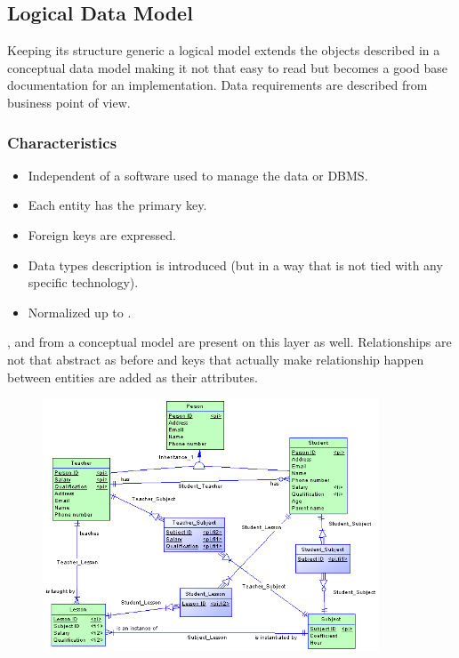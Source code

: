 \subsection{Logical Data Model}

Keeping its structure generic a logical model extends the objects described in a conceptual data model making it not that easy to read but becomes a good base documentation for an implementation. Data requirements are described from business point of view.

\subsubsection{Characteristics}
\begin{itemize}
	\item Independent of a software used to manage the data or DBMS.
	\item Each entity has the primary key.
	\item Foreign keys are expressed.
	\item Data types description is introduced (but in a way that is not tied with any specific technology).
	\item Normalized up to .
\end{itemize}
,  and  from a conceptual model are present on this layer as well. Relationships are not that abstract as before and keys that actually make relationship happen between entities are added as their attributes.

\begin{figure}[H]
	\centering
	\includegraphics[width=10cm]{../img/Logical_Model_PowerDesigner}
	\caption{\cite{LogicalModelExample}}
\end{figure}

